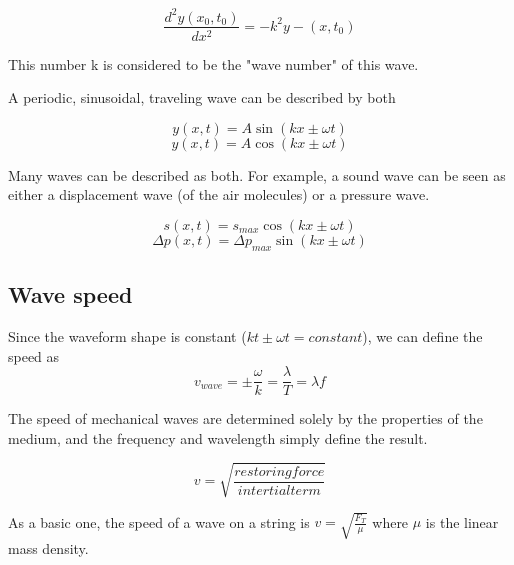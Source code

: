\documentclass{article}
\begin{document}
$$\frac{d^2y(x_0,t_0)}{dx^2}=-k^2y-(x,t_0)$$

This number k is considered to be the "wave number" of this wave.

A periodic, sinusoidal, traveling wave can be described by both

$$y(x,t)=A\sin{(kx\pm \omega t)}$$
$$y(x,t)=A\cos{(kx\pm \omega t)}$$

Many waves can be described as both. For example, a sound wave can be seen as either a displacement wave (of the air molecules)
or a pressure wave. 

$$s(x,t)=s_{max}\cos{(kx\pm \omega t)}$$
$$\Delta p(x,t)=\Delta p_{max}\sin{(kx\pm \omega t)}$$

\subsection{Wave speed}

Since the waveform shape is constant ($kt\pm \omega t = constant$), we can define the speed as 
$$v_{wave}=\pm \frac{\omega}{k}=\frac{\lambda}{T}=\lambda f$$

The speed of mechanical waves are determined solely by the properties of the medium, and the frequency and wavelength simply
define the result.

$$v=\sqrt{\frac{restoring force}{intertial term}}$$

As a basic one, the speed of a wave on a string is $v=\sqrt{\frac{F_T}{\mu}}$ where $\mu$ is the linear mass density.
\end{document}
